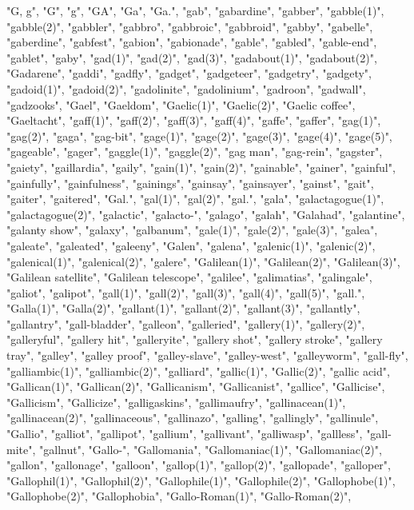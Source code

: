 "G, g",
"G",
"g",
"GA",
"Ga",
"Ga.",
"gab",
"gabardine",
"gabber",
"gabble(1)",
"gabble(2)",
"gabbler",
"gabbro",
"gabbroic",
"gabbroid",
"gabby",
"gabelle",
"gaberdine",
"gabfest",
"gabion",
"gabionade",
"gable",
"gabled",
"gable-end",
"gablet",
"gaby",
"gad(1)",
"gad(2)",
"gad(3)",
"gadabout(1)",
"gadabout(2)",
"Gadarene",
"gaddi",
"gadfly",
"gadget",
"gadgeteer",
"gadgetry",
"gadgety",
"gadoid(1)",
"gadoid(2)",
"gadolinite",
"gadolinium",
"gadroon",
"gadwall",
"gadzooks",
"Gael",
"Gaeldom",
"Gaelic(1)",
"Gaelic(2)",
"Gaelic coffee",
"Gaeltacht",
"gaff(1)",
"gaff(2)",
"gaff(3)",
"gaff(4)",
"gaffe",
"gaffer",
"gag(1)",
"gag(2)",
"gaga",
"gag-bit",
"gage(1)",
"gage(2)",
"gage(3)",
"gage(4)",
"gage(5)",
"gageable",
"gager",
"gaggle(1)",
"gaggle(2)",
"gag man",
"gag-rein",
"gagster",
"gaiety",
"gaillardia",
"gaily",
"gain(1)",
"gain(2)",
"gainable",
"gainer",
"gainful",
"gainfully",
"gainfulness",
"gainings",
"gainsay",
"gainsayer",
"gainst",
"gait",
"gaiter",
"gaitered",
"Gal.",
"gal(1)",
"gal(2)",
"gal.",
"gala",
"galactagogue(1)",
"galactagogue(2)",
"galactic",
"galacto-",
"galago",
"galah",
"Galahad",
"galantine",
"galanty show",
"galaxy",
"galbanum",
"gale(1)",
"gale(2)",
"gale(3)",
"galea",
"galeate",
"galeated",
"galeeny",
"Galen",
"galena",
"galenic(1)",
"galenic(2)",
"galenical(1)",
"galenical(2)",
"galere",
"Galilean(1)",
"Galilean(2)",
"Galilean(3)",
"Galilean satellite",
"Galilean telescope",
"galilee",
"galimatias",
"galingale",
"galiot",
"galipot",
"gall(1)",
"gall(2)",
"gall(3)",
"gall(4)",
"gall(5)",
"gall.",
"Galla(1)",
"Galla(2)",
"gallant(1)",
"gallant(2)",
"gallant(3)",
"gallantly",
"gallantry",
"gall-bladder",
"galleon",
"galleried",
"gallery(1)",
"gallery(2)",
"galleryful",
"gallery hit",
"galleryite",
"gallery shot",
"gallery stroke",
"gallery tray",
"galley",
"galley proof",
"galley-slave",
"galley-west",
"galleyworm",
"gall-fly",
"galliambic(1)",
"galliambic(2)",
"galliard",
"gallic(1)",
"Gallic(2)",
"gallic acid",
"Gallican(1)",
"Gallican(2)",
"Gallicanism",
"Gallicanist",
"gallice",
"Gallicise",
"Gallicism",
"Gallicize",
"galligaskins",
"gallimaufry",
"gallinacean(1)",
"gallinacean(2)",
"gallinaceous",
"gallinazo",
"galling",
"gallingly",
"gallinule",
"Gallio",
"galliot",
"gallipot",
"gallium",
"gallivant",
"galliwasp",
"gallless",
"gall-mite",
"gallnut",
"Gallo-",
"Gallomania",
"Gallomaniac(1)",
"Gallomaniac(2)",
"gallon",
"gallonage",
"galloon",
"gallop(1)",
"gallop(2)",
"gallopade",
"galloper",
"Gallophil(1)",
"Gallophil(2)",
"Gallophile(1)",
"Gallophile(2)",
"Gallophobe(1)",
"Gallophobe(2)",
"Gallophobia",
"Gallo-Roman(1)",
"Gallo-Roman(2)",
